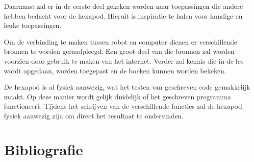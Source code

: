 \documentclass[10pt,a4paper]{article}
\begin{document}
Daarnaast zal er in de eerste deel gekeken worden naar toepassingen die andere hebben bedacht voor de hexapod. Hieruit is inspiratie te halen voor handige en leuke toepassingen.

Om de verbinding te maken tussen robot en computer dienen er verschillende bronnen te worden geraadpleegd. Een groot deel van die bronnen zal worden voorzien door gebruik te maken van het internet. Verder zal kennis die in de les wordt opgedaan, worden toegepast en de boeken kunnen worden bekeken.


De hexapod is al fysiek aanwezig, wat het testen van geschreven code gemakkelijk maakt. Op deze manier wordt gelijk duidelijk of het geschreven programma functioneert. Tijdens het schrijven van de verschillende functies zal de hexapod fysiek aanwezig zijn om direct het resultaat te ondervinden.
\newpage

\newpage

\section{Bibliografie}


\end{document}
